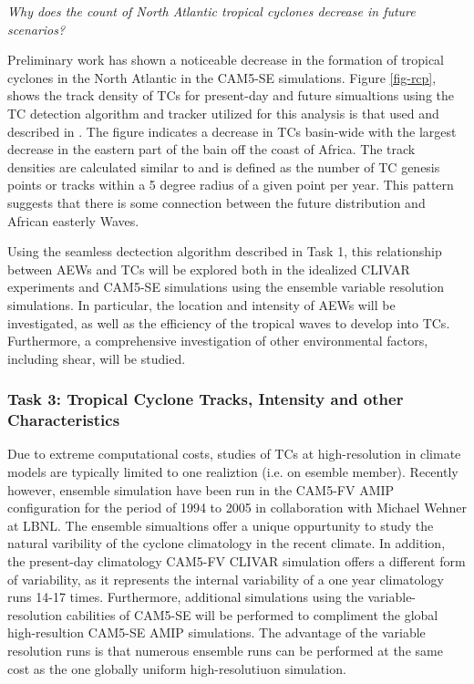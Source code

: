 \documentclass[11pt]{article}
\begin{document}

\emph{Why does the count of North Atlantic tropical cyclones decrease in future scenarios?}

Preliminary work has shown a noticeable decrease in the formation of tropical cyclones in the North Atlantic in the CAM5-SE simulations. Figure \ref{fig-rcp}, shows the track density of TCs for present-day and future simualtions using the TC detection algorithm and tracker utilized for this analysis is that used and described in \citet{Zhao2009}. The figure indicates a decrease in TCs basin-wide with the largest decrease in the eastern part of the bain off the coast of Africa. The track densities are calculated similar to \citet{Done2013} and is defined as the number of TC genesis points or tracks within a 5 degree radius of a given point per year. This pattern suggests that there is some connection between the future distribution and African easterly Waves.

Using the seamless dectection algorithm described in Task 1, this relationship between AEWs and TCs will be explored both in the idealized CLIVAR experiments and CAM5-SE simulations using the ensemble variable resolution simulations. In particular, the location and intensity of AEWs will be investigated, as well as the efficiency of the tropical waves to develop into TCs. Furthermore, a comprehensive investigation of other environmental factors, including shear, will be studied.

\subsubsection{Task 3: Tropical Cyclone Tracks, Intensity and other Characteristics}

Due to extreme computational costs, studies of TCs at high-resolution in climate models are typically limited to one realiztion (i.e. on esemble member). Recently however, ensemble simulation have been run in the CAM5-FV AMIP configuration for the period of 1994 to 2005 in collaboration with Michael Wehner at LBNL. The ensemble simualtions offer a unique oppurtunity to study the natural varibility of the cyclone climatology in the recent climate. In addition, the present-day climatology CAM5-FV CLIVAR simulation offers a different form of variability, as it represents the internal variability of a one year climatology runs 14-17 times. Furthermore, additional simulations using the variable-resolution cabilities of CAM5-SE will be performed to compliment the global high-resultion CAM5-SE AMIP simulations. The advantage of the variable resolution runs is that numerous ensemble runs can be performed at the same cost as the one globally uniform high-resolutiuon simulation.
\end{document}
